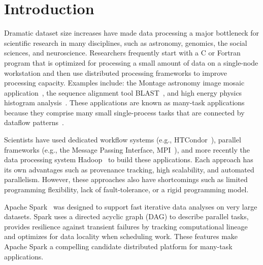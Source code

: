 \documentclass[conference]{IEEEtran}
\begin{document}
\section{Introduction}
Dramatic dataset size increases have made data processing a major bottleneck for scientific research in many disciplines, such as astronomy, genomics, the social sciences, and neuroscience.
Researchers frequently start with a C or Fortran program that is optimized for processing a small amount of data on a single-node workstation and then use distributed processing frameworks to improve processing capacity. Examples include: the Montage astronomy image mosaic application~\cite{jacob09},  the sequence alignment tool BLAST~\cite{altschul90}, and high energy physics histogram analysis~\cite{ekanayake08}.
These applications are known as many-task applications because they comprise many small single-process tasks that are connected by dataflow patterns~\cite{raicu08}.

Scientists have used dedicated workflow systems (e.g., HTCondor~\cite{litzkow88}), parallel frameworks (e.g., the Message Passing Interface, MPI~\cite{gropp96}), and more recently the data processing system Hadoop~\cite{HADOOP}  to build these applications. Each approach has its own advantages such as provenance tracking, high scalability, and automated parallelism. However, these approaches also have shortcomings such as limited programming flexibility, lack of fault-tolerance, or a rigid programming model.


Apache Spark~\cite{zaharia12} was designed to support fast iterative data analyses on very large datasets.
Spark uses a directed acyclic graph (DAG) to describe parallel tasks, 
provides resilience against transient failures by tracking computational lineage
and optimizes for data locality when scheduling work.
These features make Apache Spark a compelling candidate distributed platform for many-task applications.
\end{document}
